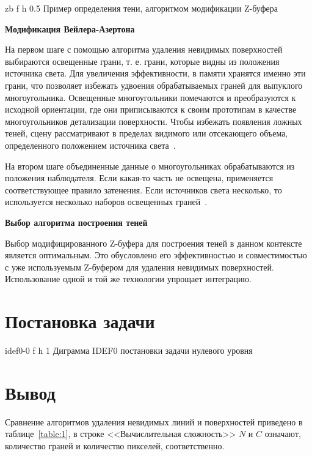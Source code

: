 	{zb} %
	{f} %
	{h} %
	{0.5\textwidth} %
	{Пример определения тени, алгоритмом модификации Z-буфера} %

\textbf{Модификация Вейлера-Азертона}

На первом шаге с помощью алгоритма удаления невидимых поверхностей выбираются освещенные грани, т. е. грани, которые видны из положения источника света.
Для увеличения эффективности, в памяти хранятся именно эти грани, что позволяет избежать удвоения обрабатываемых граней для выпуклого многоугольника.
Освещенные многоугольники помечаются и преобразуются к исходной ориентации, где они приписываются к своим прототипам в качестве многоугольников детализации поверхности.
Чтобы избежать появления ложных теней, сцену рассматривают в пределах видимого или отсекающего объема, определенного положением источника света~\cite{letion}.

На втором шаге объединенные данные о многоугольниках обрабатываются из положения наблюдателя. Если какая-то часть не освещена, применяется соответствующее правило затенения.
Если источников света несколько, то используется несколько наборов освещенных граней~\cite{letion}.

\textbf{Выбор алгоритма построения теней}

Выбор модифицированного Z-буфера для построения теней в данном контексте является оптимальным. Это обусловлено его эффективностью и совместимостью с уже используемым Z-буфером для удаления невидимых поверхностей.
Использование одной и той же технологии упрощает интеграцию.

\section{Постановка задачи}

	{idef0-0} %
	{f} %
	{h} %
	{1\textwidth} %
	{Диграмма IDEF0 постановки задачи нулевого уровня} %

	
\section*{Вывод}

Сравнение алгоритмов удаления невидимых линий и поверхностей приведено в таблице~\ref{table:1}, в строке <<Вычислительная сложность>> $N$ и $C$ означают, количество граней и количество пикселей, соответственно.

